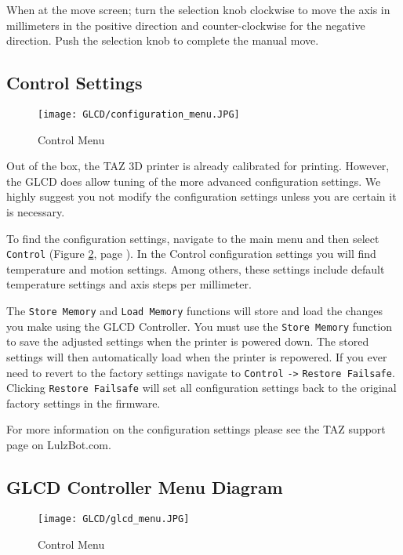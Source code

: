 When at the move screen; turn the selection knob clockwise to move the axis in millimeters in the positive direction and counter-clockwise for the negative direction. Push the selection knob to complete the manual move.

\subsection{Control Settings}

\begin{figure}[H]
\centering
\texttt{[image: GLCD/configuration\_menu.JPG]}
\caption{Control Menu}
\label{fig:configuration_menu}
\end{figure}

Out of the box, the TAZ 3D printer is already calibrated for printing. However, the GLCD does allow tuning of the more advanced configuration settings. We highly suggest you not modify the configuration settings unless you are certain it is necessary.

To find the configuration settings, navigate to the main menu and then select \texttt{Control} (Figure \ref{fig:configuration_menu}, page \pageref{fig:configuration_menu}). In the Control configuration settings you will find temperature and motion settings. Among others, these settings include default temperature settings and axis steps per millimeter.

The \texttt{Store Memory} and \texttt{Load Memory} functions will store and load the changes you make using the GLCD Controller. You must use the \texttt{Store Memory} function to save the adjusted settings when the printer is powered down. The stored settings will then automatically load when the printer is repowered. If you ever need to revert to the factory settings navigate to \texttt{Control} \texttt{->} \texttt{Restore Failsafe}. Clicking \texttt{Restore Failsafe} will set all configuration settings back to the original factory settings in the firmware.

For more information on the configuration settings please see the TAZ support page on LulzBot.com.

\subsection{GLCD Controller Menu Diagram}
\begin{figure}[H]
\centering
\texttt{[image: GLCD/glcd\_menu.JPG]}
\caption{Control Menu}
\label{fig:configuration_menu}
\end{figure}




